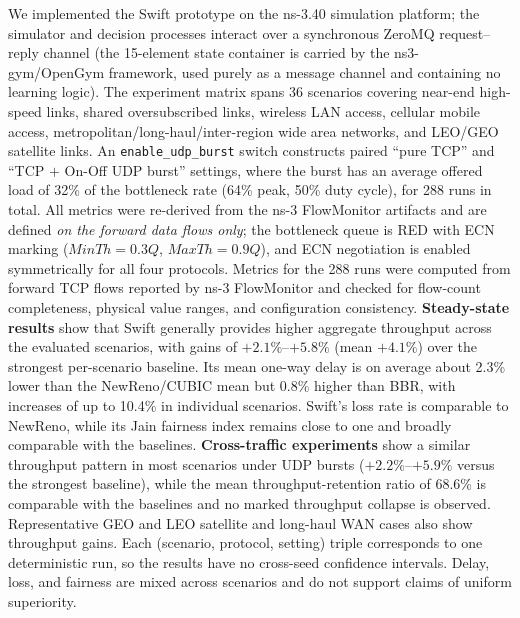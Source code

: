 \begin{englishabstract}
We implemented the Swift prototype on the ns-3.40 simulation platform; the simulator and decision processes interact over a synchronous ZeroMQ request--reply channel (the 15-element state container is carried by the ns3-gym/OpenGym framework, used purely as a message channel and containing no learning logic). The experiment matrix spans 36 scenarios covering near-end high-speed links, shared oversubscribed links, wireless LAN access, cellular mobile access, metropolitan/long-haul/inter-region wide area networks, and LEO/GEO satellite links. An \texttt{enable\_udp\_burst} switch constructs paired ``pure TCP'' and ``TCP $+$ On-Off UDP burst'' settings, where the burst has an average offered load of 32\% of the bottleneck rate (64\% peak, 50\% duty cycle), for 288 runs in total. All metrics were re-derived from the ns-3 FlowMonitor artifacts and are defined \emph{on the forward data flows only}; the bottleneck queue is RED with ECN marking ($MinTh=0.3Q$, $MaxTh=0.9Q$), and ECN negotiation is enabled symmetrically for all four protocols. Metrics for the 288 runs were computed from forward TCP flows reported by ns-3 FlowMonitor and checked for flow-count completeness, physical value ranges, and configuration consistency. \textbf{Steady-state results} show that Swift generally provides higher aggregate throughput across the evaluated scenarios, with gains of $+2.1\%$--$+5.8\%$ (mean $+4.1\%$) over the strongest per-scenario baseline. Its mean one-way delay is on average about 2.3\% lower than the NewReno/CUBIC mean but 0.8\% higher than BBR, with increases of up to 10.4\% in individual scenarios. Swift's loss rate is comparable to NewReno, while its Jain fairness index remains close to one and broadly comparable with the baselines. \textbf{Cross-traffic experiments} show a similar throughput pattern in most scenarios under UDP bursts ($+2.2\%$--$+5.9\%$ versus the strongest baseline), while the mean throughput-retention ratio of 68.6\% is comparable with the baselines and no marked throughput collapse is observed. Representative GEO and LEO satellite and long-haul WAN cases also show throughput gains. Each (scenario, protocol, setting) triple corresponds to one deterministic run, so the results have no cross-seed confidence intervals. Delay, loss, and fairness are mixed across scenarios and do not support claims of uniform superiority.


\end{englishabstract}
